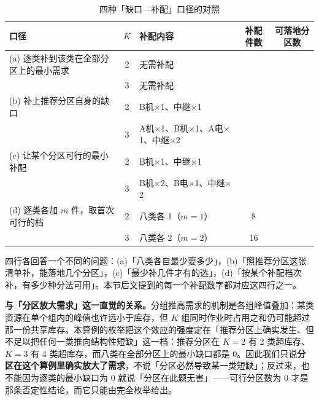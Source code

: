 \begin{table}[htbp]
	\caption{四种「缺口—补配」口径的对照}
	\label{tab:q4-patch}
	\centering
	\small
	\begin{tabularx}{\textwidth}{@{}>{\hsize=1.10\hsize}X c >{\hsize=0.90\hsize}X c c@{}}
		\toprule
		口径 & $K$ & 补配内容 & 补配件数 & 可落地分区数 \\
		\midrule
		(a) 逐类补到该类在全部分区上的最小需求 & 2 & 无需补配 & \mtQfourPerClassMinPatch & \mtQfourFeasible \\
		 & 3 & 无需补配 & \mtQfourPerClassMinPatch & \mtQfourFeasible \\
		\addlinespace
		(b) 补上推荐分区自身的缺口 & 2 & B机$\times$1、中继$\times$1 & \mtQfourMinPatchKTwo & \mtQfourRecGapFeasKTwo \\
		 & 3 & A机$\times$1、B机$\times$1、A电$\times$1、中继$\times$2 & \mtQfourMinPatchKThree & \mtQfourRecGapFeasKThree \\
		\addlinespace
		(c) 让某个分区可行的最小补配 & 2 & B机$\times$1、中继$\times$1 & \mtQfourMinPatchKTwo & \mtQfourMinPatchFeasKTwo \\
		 & 3 & B机$\times$2、B电$\times$1、中继$\times$2 & \mtQfourMinPatchKThree & \mtQfourMinPatchFeasKThree \\
		\addlinespace
		(d) 逐类各加 $m$ 件，取首次可行的档 & 2 & 八类各 1（$m=1$） & 8 & \mtQfourThreshKTwoMOne \\
		 & 3 & 八类各 2（$m=2$） & 16 & \mtQfourThreshKThreeMTwo \\
		\bottomrule
	\end{tabularx}
\end{table}

四行各回答一个不同的问题：(a)「八类各自最少要多少」，(b)「照推荐分区这张清单补，能落地几个分区」，(c)「最少补几件才有的选」，(d)「按某个补配档次补，有多少种分法可用」。本节后文提到的每一个补配数字都对应这四行之一。

\textbf{与「分区放大需求」这一直觉的关系。}分组推高需求的机制是各组峰值叠加：某类资源在单个组内的峰值也许远小于库存，但 $K$ 组同时作业时占用之和仍可能超过那一份共享库存。本算例的枚举把这个效应的强度定在「推荐分区上确实发生、但不足以把任何一类推向结构性短缺」这一档：推荐分区在 $K=2$ 有 2 类超库存、$K=3$ 有 4 类超库存，而八类在全部分区上的最小缺口都是 0。因此我们只说\textbf{分区在这个算例里确实放大了需求}，不说「分区必然导致某一类短缺」；反过来，也不能因为逐类的最小缺口为 0 就说「分区在此题无害」——可行分区数为 0 才是那条否定性结论，而它只能由完全枚举给出。

